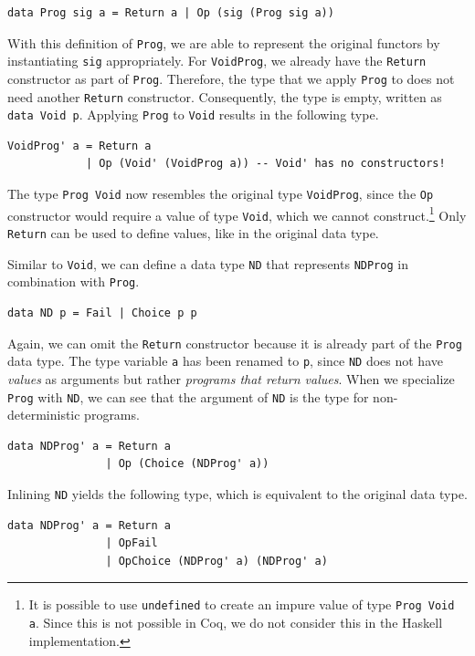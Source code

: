 \documentclass[a4paper, 11pt, fleqn, twoside, abstract=on]{scrreprt}
\newcommand{\hinl}[1]{\texttt{#1}}
\newcommand{\cinl}[1]{\texttt{#1}}
\begin{document}
\begin{verbatim}
data Prog sig a = Return a | Op (sig (Prog sig a))
\end{verbatim}
\noindent
With this definition of \hinl{Prog}, we are able to represent the original functors by instantiating \hinl{sig} appropriately.
For \hinl{VoidProg}, we already have the \hinl{Return} constructor as part of \hinl{Prog}.
Therefore, the type that we apply \hinl{Prog} to does not need another \hinl{Return} constructor.
Consequently, the type is empty, written as \hinl{data Void p}.
Applying \cinl{Prog} to \cinl{Void} results in the following type.

\begin{verbatim}
VoidProg' a = Return a
            | Op (Void' (VoidProg a)) -- Void' has no constructors!
\end{verbatim}

The type \hinl{Prog Void} now resembles the original type \hinl{VoidProg}, since the \hinl{Op} constructor would require a value of type \hinl{Void}, which we cannot construct.\footnote{It is possible to use \texttt{undefined} to create an impure value of type \texttt{Prog Void a}.
Since this is not possible in Coq, we do not consider this in the Haskell implementation.}
Only \hinl{Return} can be used to define values, like in the  original data type.

Similar to \hinl{Void}, we can define a data type \hinl{ND} that represents \hinl{NDProg} in combination with \hinl{Prog}.

\label{min:ND}
\begin{verbatim}
data ND p = Fail | Choice p p
\end{verbatim}
\noindent
Again, we can omit the \hinl{Return} constructor because it is  already part of the \hinl{Prog} data type.
The type variable \hinl{a} has been renamed to \hinl{p}, since \hinl{ND} does not have \textit{values} as arguments but rather \textit{programs that return values}.
When we specialize \hinl{Prog} with \hinl{ND}, we can see that the argument of \hinl{ND} is the type for non-deterministic programs.

\begin{verbatim}
data NDProg' a = Return a
               | Op (Choice (NDProg' a))
\end{verbatim}
\noindent
Inlining \hinl{ND} yields the following type, which is equivalent to the original data type.

\begin{verbatim}
data NDProg' a = Return a
               | OpFail
               | OpChoice (NDProg' a) (NDProg' a)
\end{verbatim}
\end{document}

